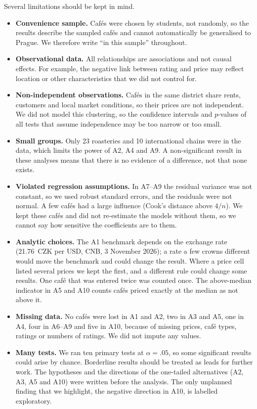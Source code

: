 \documentclass[11pt,a4paper]{article}
\begin{document}
Several limitations should be kept in mind.
\begin{itemize}
  \item \textbf{Convenience sample.} Caf\'es were chosen by students, not randomly, so the results describe the sampled caf\'es and cannot automatically be generalised to Prague. We therefore write ``in this sample'' throughout.
  \item \textbf{Observational data.} All relationships are associations and not causal effects. For example, the negative link between rating and price may reflect location or other characteristics that we did not control for.
  \item \textbf{Non-independent observations.} Caf\'es in the same district share rents, customers and local market conditions, so their prices are not independent. We did not model this clustering, so the confidence intervals and $p$-values of all tests that assume independence may be too narrow or too small.
  \item \textbf{Small groups.} Only 23 roasteries and 10 international chains were in the data, which limits the power of A2, A4 and A9. A non-significant result in these analyses means that there is no evidence of a difference, not that none exists.
  \item \textbf{Violated regression assumptions.} In A7--A9 the residual variance was not constant, so we used robust standard errors, and the residuals were not normal. A few caf\'es had a large influence (Cook's distance above $4/n$). We kept these caf\'es and did not re-estimate the models without them, so we cannot say how sensitive the coefficients are to them.
  \item \textbf{Analytic choices.} The A1 benchmark depends on the exchange rate (21.76~CZK per USD, CNB, 3 November 2026); a rate a few crowns different would move the benchmark and could change the result. Where a price cell listed several prices we kept the first, and a different rule could change some results. One caf\'e that was entered twice was counted once. The above-median indicator in A5 and A10 counts caf\'es priced exactly at the median as not above it.
  \item \textbf{Missing data.} No caf\'es were lost in A1 and A2, two in A3 and A5, one in A4, four in A6--A9 and five in A10, because of missing prices, caf\'e types, ratings or numbers of ratings. We did not impute any values.
  \item \textbf{Many tests.} We ran ten primary tests at $\alpha = .05$, so some significant results could arise by chance. Borderline results should be treated as leads for further work. The hypotheses and the directions of the one-tailed alternatives (A2, A3, A5 and A10) were written before the analysis. The only unplanned finding that we highlight, the negative direction in A10, is labelled exploratory.
\end{itemize}
\end{document}
